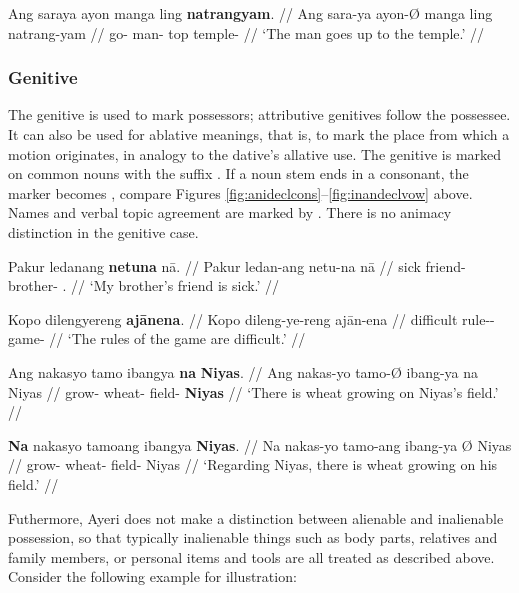 \a\label{ex:datlocprep}\begingl
	\gla Ang saraya ayon manga ling \textbf{natrangyam}. //
	\glb Ang sara-ya ayon-Ø manga ling natrang-yam //
	\glc \AgtT{} go-\TsgM{} man-\Top{} \Dyn{} top temple-\Dat{} //
	\glft `The man goes up to the temple.' //
\endgl

\xe


\subsubsection{Genitive}
\label{subsubsec:genitive}

The genitive is used to mark possessors; attributive genitives follow the 
possessee. It can also be used for ablative meanings, that is, to mark the 
place from which a motion originates, in analogy to the dative's allative use. 
The genitive is marked on common nouns with the suffix . If a 
noun stem ends in a consonant, the marker becomes , compare 
Figures \ref{fig:anideclcons}–\ref{fig:inandeclvow} above. Names and verbal 
topic agreement are marked by . There is no animacy distinction in 
the genitive case.

\pex
\a\begingl
	\gla Pakur ledanang \textbf{netuna} nā. //
	\glb Pakur ledan-ang netu-na nā //
	\glc sick friend-\Aarg{} brother-\Gen{} \Fsg{}.\Gen{} //
	\glft `My brother's friend is sick.' //
\endgl

\a\begingl
	\gla Kopo dilengyereng \textbf{ajānena}. //
	\glb Kopo dileng-ye-reng ajān-ena //
	\glc difficult rule-\Pl{}-\AargI{} game-\Gen{} //
	\glft `The rules of the game are difficult.' //
\endgl

\a\begingl
	\gla Ang nakasyo tamo ibangya \textbf{na} \textbf{Niyas}. //
	\glb Ang nakas-yo tamo-Ø ibang-ya na Niyas //
	\glc \AgtT{} grow-\TsgN{} wheat-\Top{} field-\Loc{} \Gen 
		\textbf{Niyas} //
	\glft `There is wheat growing on Niyas's field.' //
\endgl

\a\begingl
	\gla \textbf{Na} nakasyo tamoang ibangya \textbf{{}} \textbf{Niyas}. //
	\glb Na nakas-yo tamo-ang ibang-ya Ø Niyas //
	\glc \GenT{} grow-\TsgN{} wheat-\Aarg{} field-\Loc{} \Top{} Niyas //
	\glft `Regarding Niyas, there is wheat growing on his field.' //
\endgl

\xe

Futhermore, Ayeri does not make a distinction between alienable and inalienable 
possession, so that typically inalienable things such as body parts, 
relatives and family members, or personal items and tools are all treated 
as described above. Consider the following example for illustration:

